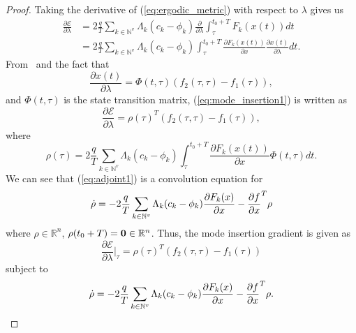 \documentclass[conference]{IEEEtran}
\begin{document}
\begin{proof}
Taking the derivative of (\ref{eq:ergodic_metric}) with respect to $\lambda$ gives us
\begin{align}\label{eq:mode_insertion1}
\frac{\partial \mathcal{E}}{\partial \lambda} & = 2 \frac{q}{T}\sum_{k \in \mathbb{N}^v} \Lambda_k(c_k - \phi_k)\frac{\partial}{\partial \lambda} \int_{\tau}^{t_0+T} F_k(x(t))dt \\
& =2 \frac{q}{T}\sum_{k \in \mathbb{N}^v} \Lambda_k(c_k - \phi_k) \int_{\tau}^{t_0+T} \frac{ \partial F_k(x(t))}{\partial x} \frac{\partial x(t)}{\partial \lambda}dt. \nonumber
\end{align}
From~\cite{mode transition stuff} and the fact that
\begin{equation}
\frac{\partial x(t)}{\partial \lambda} = \Phi(t,\tau) \left( f_2(\tau, \tau) - f_1(\tau) \right),
\end{equation}
and $\Phi(t, \tau)$ is the state transition matrix, (\ref{eq:mode_insertion1}) is written as
\begin{equation} \label{eq:mode_intersion2}
\frac{\partial \mathcal{E}}{\partial \lambda} = \rho(\tau)^T \left( f_2(\tau, \tau) - f_1(\tau) \right),
\end{equation}
where  
\begin{equation} \label{eq:adjoint1}
\rho(\tau) = 2 \frac{q}{T}\sum_{k \in \mathbb{N}^v} \Lambda_k(c_k - \phi_k) \int_{\tau}^{t_0+T} \frac{ \partial F_k(x(t))}{\partial x} \Phi(t,\tau)dt.
\end{equation} 
We can see that (\ref{eq:adjoint1}) is a convolution equation for
\begin{equation}
\dot{\bold{\rho}} = - 2\frac{q}{T}\sum_{k \in \mathbb{N}^v}\Lambda_k(c_k - \phi_k) \frac{\partial F_k(x)}{\partial x} - \frac{\partial f}{\partial x }^T \rho
\end{equation}
where $\rho \in \mathbb{R}^n$, $\rho(t_0+T) = \bold{0} \in \mathbb{R}^n$.
Thus, the mode insertion gradient is given as
\begin{equation}
 \frac{\partial \mathcal{E}}{\partial \lambda}\Big | _\tau = \rho(\tau) ^T (f_2(\tau,\tau) - f_1(\tau))
\end{equation}
subject to
\begin{equation}
\dot{\bold{\rho}} = - 2\frac{q}{T}\sum_{k \in \mathbb{N}^v}\Lambda_k(c_k - \phi_k) \frac{\partial F_k(x)}{\partial x} - \frac{\partial f}{\partial x }^T \rho.
\end{equation}
\end{proof}
\end{document}
